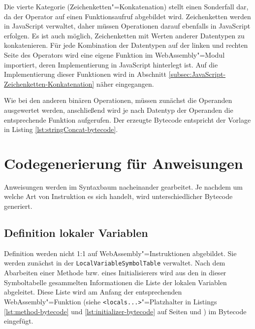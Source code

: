 

Die vierte Kategorie (Zeichenketten"=Konkatenation) stellt einen Sonderfall dar, da der Operator auf einen Funktionsaufruf abgebildet wird. Zeichenketten werden in JavaScript verwaltet, daher müssen Operationen darauf ebenfalls in JavaScript erfolgen. Es ist auch möglich, Zeichenketten mit Werten anderer Datentypen zu konkatenieren. Für jede Kombination der Datentypen auf der linken und rechten Seite des Operators wird eine eigene Funktion im WebAssembly"=Modul importiert, deren Implementierung in JavaScript hinterlegt ist. Auf die Implementierung dieser Funktionen wird in Abschnitt \ref{subsec:JavaScript-Zeichenketten-Konkatenation} näher eingegangen.

Wie bei den anderen binären Operationen, müssen zunächst die Operanden ausgewertet werden, anschließend wird je nach Datentyp der Operanden die entsprechende Funktion aufgerufen. Der erzeugte Bytecode entspricht der Vorlage in Listing \ref{lst:stringConcat-bytecode}.



\section{Codegenerierung für Anweisungen}

Anweisungen werden im Syntaxbaum nacheinander gearbeitet. Je nachdem um welche Art von Instruktion es sich handelt, wird unterschiedlicher Bytecode generiert.

\subsection{Definition lokaler Variablen}

Definition werden nicht 1:1 auf WebAssembly"=Instruktionen abgebildet. Sie werden zunächst in der \lstinline{LocalVariableSymbolTable} verwaltet. Nach dem Abarbeiten einer Methode bzw. eines Initialisierers wird aus den in dieser Symboltabelle gesammelten Informationen die Liste der lokalen Variablen abgeleitet. Diese Liste wird am Anfang der entsprechenden WebAssembly"=Funktion (siehe \lstinline{<locals...>}"=Platzhalter in Listings \ref{lst:method-bytecode} und \ref{lst:initializer-bytecode} auf Seiten \pageref{lst:method-bytecode} und \pageref{lst:initializer-bytecode}) im Bytecode eingefügt.

